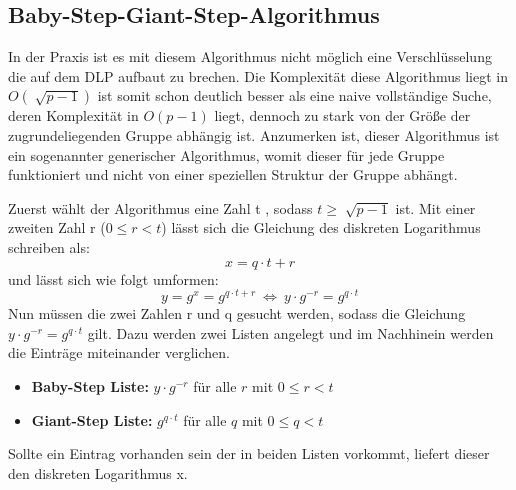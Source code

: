 	\subsection{Baby-Step-Giant-Step-Algorithmus}
		In der Praxis ist es mit diesem Algorithmus nicht möglich eine Verschlüsselung die auf dem DLP aufbaut zu brechen. Die Komplexität diese Algorithmus liegt in $O(\sqrt[]{p-1})$ ist somit schon deutlich besser als eine naive vollständige Suche, deren Komplexität in $O(p-1)$ liegt, dennoch zu stark von der Größe der zugrundeliegenden Gruppe abhängig ist. Anzumerken ist, dieser Algorithmus ist ein sogenannter generischer Algorithmus, womit dieser für jede Gruppe funktioniert und nicht von einer speziellen Struktur der Gruppe abhängt.~\cite{Kryptografie:in:Theorie:und:Praxis}
		
		Zuerst wählt der Algorithmus eine Zahl t \myin {}, sodass $t \geq \sqrt[]{p-1}$ ist. Mit einer zweiten Zahl r ($0 \leq r<t$) lässt sich die Gleichung des diskreten Logarithmus schreiben als:
		\begin{equation}
			x = q \cdot t + r
			\label{Gleichung Diskreter Logarithmus}
		\end{equation}
		und lässt sich wie folgt umformen:
		\begin{equation}
			y = g^x = g^{q \cdot t + r}~\Leftrightarrow~y \cdot g^{-r} = g^{q \cdot t}
			\label{Gleichung Baby steps Giant steps}
		\end{equation}
		Nun müssen die zwei Zahlen r und q gesucht werden, sodass die Gleichung $y \cdot g^{-r} = g^{q \cdot t}$ gilt. Dazu werden zwei Listen angelegt und im Nachhinein werden die Einträge miteinander verglichen. 
		\begin{itemize}
			\item[] \textbf{Baby-Step Liste:} $y \cdot g^{-r}$ für alle $r$ mit $0 \leq r < t$
			\item[] \textbf{Giant-Step Liste:} $g^{q \cdot t}$ für alle $q$ mit $0 \leq q < t$
		\end{itemize}
		Sollte ein Eintrag vorhanden sein der in beiden Listen vorkommt, liefert dieser den diskreten Logarithmus x.~\cite{Kryptografie:in:Theorie:und:Praxis}
		
